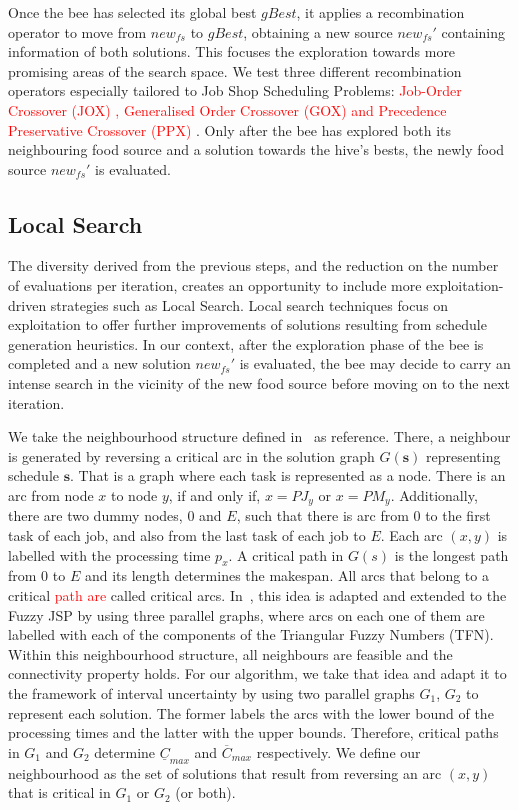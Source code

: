 \documentclass[sn-mathphys]{sn-jnl}%
\theoremstyle{thmstyleone}%
\theoremstyle{thmstyletwo}%
\theoremstyle{thmstylethree}%
\newcommand{\review}[1]{\textcolor{red}{#1}} %
\begin{document}
Once the bee has selected its global best $gBest$, it applies a recombination operator to move from $new_{fs}$ to $gBest$, obtaining a new source $new_{fs}'$ containing information of both solutions. This focuses the exploration towards more promising areas of the search space. We test three different recombination operators especially tailored to Job Shop Scheduling Problems: \review{Job-Order Crossover (JOX) \cite{Ono1996}, Generalised Order Crossover (GOX) \cite{Bierwirth1995} and Precedence Preservative Crossover (PPX) \cite{Bierwirth1996}}. Only after the bee has explored both its neighbouring food source and a solution towards the hive's bests, the newly food source ${new_\mathit{fs}'}$ is evaluated.


\subsection{Local Search}\label{subsec:LocalSearch}
The diversity derived from the previous steps, and the reduction on the number of evaluations per iteration, creates an opportunity to include more exploitation-driven strategies such as Local Search. Local search techniques focus on exploitation to offer further improvements of solutions resulting from schedule generation heuristics. In our context, after the exploration phase of the bee is completed and a new solution $new_{fs}'$ is evaluated, the bee may decide to carry an intense search in the vicinity of the new food source before moving on to the next iteration.

We take the neighbourhood structure defined in~\cite{VanLaarhoven1992} as reference. There, a neighbour is generated by reversing a critical arc in the solution graph $G(\boldsymbol{s})$ representing schedule $\boldsymbol{s}$. That is a graph where each task is represented as a node. There is an arc from node $x$ to node $y$, if and only if, $x=PJ_y$ or $x=PM_y$. Additionally, there are two dummy nodes, $0$ and $E$, such that there is arc from $0$ to the first task of each job, and also from the last task of each job to $E$. Each arc $(x,y)$ is labelled with the processing time $p_x$. A critical path in $G(s)$ is the longest path from $0$ to $E$ and its length determines the makespan. All arcs that belong to a critical \review{path are} called critical arcs. In~\cite{GonzalezRodriguez2008b}, this idea is adapted and extended to the Fuzzy JSP by using three parallel graphs, where arcs on each one of them are labelled with each of the components of the Triangular Fuzzy Numbers (TFN). Within this neighbourhood structure, all neighbours are feasible and the connectivity property holds. For our algorithm, we take that idea and adapt it to the framework of interval uncertainty by using two parallel graphs $G_1$, $G_2$ to represent each solution. The former labels the arcs with the lower bound of the processing times and the latter with the upper bounds. Therefore, critical paths in $G_1$ and $G_2$ determine $\underline{C}_{max}$ and $\overline{C}_{max}$ respectively. We define our neighbourhood as the set of solutions that result from reversing an arc $(x,y)$ that is critical in $G_1$ or $G_2$ (or both).
\end{document}
